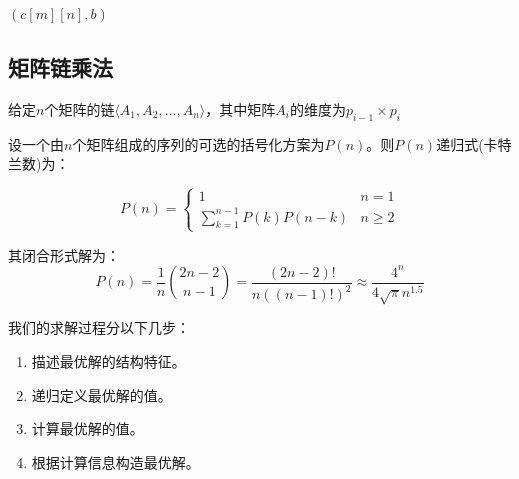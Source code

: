 \documentclass[./../main.tex]{subfiles}
\begin{document}
\begin{algorithm}[t]
    \BlankLine
    \Return $(c[m][n], b)$\;
    \caption{LCS-Length}
\end{algorithm}

\begin{algorithm}[t]
    \BlankLine
    \caption{PRINT-LCS}
\end{algorithm}

\subsection{矩阵链乘法}
给定$n$个矩阵的链$\langle A_1, A_2, \ldots, A_n \rangle$，其中矩阵$A_i$的维度为$p_{i-1} \times p_i$

设一个由$n$个矩阵组成的序列的可选的括号化方案为$P(n)$。则$P(n)$递归式(卡特兰数)为：

$$
P(n)=\begin{cases} 
1 & n=1\\
\sum\limits_{k=1}^{n-1} P(k)P(n-k) & n\geq 2
\end{cases}
$$

其闭合形式解为：
$$
P(n)=\frac{1}{n}\binom{2n-2}{n-1}=\frac{(2n-2)!}{n((n-1)!)^2}\approx\frac{4^n}{4\sqrt{\pi}n^{1.5}}
$$


我们的求解过程分以下几步：
\begin{enumerate}
    \item 描述最优解的结构特征。
    \item 递归定义最优解的值。
    \item 计算最优解的值。
    \item 根据计算信息构造最优解。
\end{enumerate}
\end{document}
